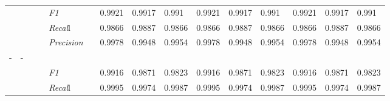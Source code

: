 \begin{table}[]
\begin{tabularx}{\textwidth}{XXlllllllllllll@{}}
                                                                    &                                                                     &                                                           &    & \textit{F1} &                                                      & 0.9921        & 0.9917        & 0.991        & 0.9921        & 0.9917        & 0.991        & 0.9921        & 0.9917        & 0.991        \\
                                                                    &                                                                     &                                                           &    & \textit{Recal}l &                                                      & 0.9866    & 0.9887    & 0.9866    & 0.9866    & 0.9887    & 0.9866    & 0.9866    & 0.9887    & 0.9866    \\
                                                                    &                                                                     &                                                           &    & \textit{Precision} &                                                      & 0.9978 & 0.9948 & 0.9954 & 0.9978 & 0.9948 & 0.9954 & 0.9978 & 0.9948 & 0.9954 \\ \midrule
- & - &  &  &                                                              &                                                                   &                                                             &                                                               &                                                                    &                                                              &                                                               &                                                                    &                                                              \\
                                                                    &                                                                     &                                                           &    & \textit{F1} &                                                      & 0.9916        & 0.9871        & 0.9823        & 0.9916        & 0.9871        & 0.9823        & 0.9916        & 0.9871        & 0.9823        \\
                                                                    &                                                                     &                                                           &    & \textit{Recal}l &                                                      & 0.9995    & 0.9974    & 0.9987    & 0.9995    & 0.9974    & 0.9987    & 0.9995    & 0.9974    & 0.9987    \\

\end{tabularx}
\end{table}
